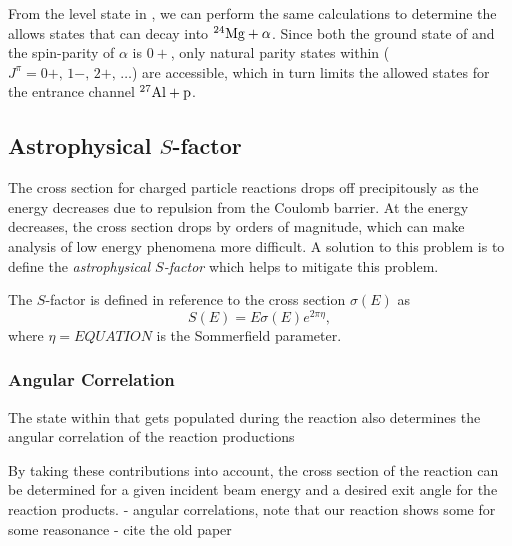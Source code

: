 From the level state in , we can perform the same calculations to
determine the allows states that can decay into ${}^{24}\textrm{Mg} + \alpha$. Since
both the ground state of  and the spin-parity of $\alpha$ is $0+$,
only natural parity states within 
($J^{\pi} = 0+,\, 1-,\, 2+,\, \ldots$) are accessible, which in turn limits the
allowed states for the entrance channel ${}^{27}\textrm{Al} + \rm{p}$.

\subsection{Astrophysical $S$-factor}

The cross section for charged particle reactions drops off precipitously as
the energy decreases due to repulsion from the Coulomb barrier. At the energy
decreases, the cross section drops by orders of magnitude, which can make
analysis of low energy phenomena more difficult. A solution to this problem is
to define the \emph{astrophysical $S$-factor} which helps to mitigate this
problem.

The $S$-factor is defined in reference to the cross section $\sigma(E)$ as
\[
    S(E) = E\sigma(E)e^{2\pi\eta},
\]
where $\eta = EQUATION$ is the Sommerfield parameter.


\subsubsection{Angular Correlation}
The state within  that gets populated during the reaction also
determines the angular correlation of the reaction productions

By taking these contributions into account, the cross section of the reaction
can be determined for a given incident beam energy and a desired exit angle for
the reaction products.
- angular correlations, note that our reaction shows some for some reasonance
- cite the old paper

